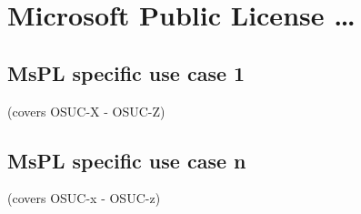 %
%
%
%
%



\section{Microsoft Public License \ldots}
\label{OSUC-01-MsPL} \label{OSUC-03-MsPL} 
\label{OSUC-06-MsPL} \label{OSUC-09-MsPL}

\label{OSUC-02-MsPL} \label{OSUC-04-MsPL} \label{OSUC-05-MsPL}
\label{OSUC-07-MsPL} \label{OSUC-08-MsPL} \label{OSUC-10-MsPL}


\subsection{MsPL specific use case 1}
(covers OSUC-X - OSUC-Z)

\subsection{MsPL specific use case n}
(covers OSUC-x - OSUC-z)


%
